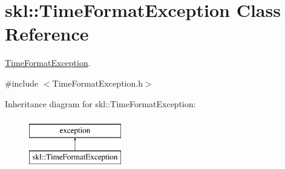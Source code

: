 \hypertarget{classskl_1_1_time_format_exception}{}\section{skl\+:\+:Time\+Format\+Exception Class Reference}
\label{classskl_1_1_time_format_exception}


\hyperlink{classskl_1_1_time_format_exception}{Time\+Format\+Exception}.  




{\ttfamily \#include $<$Time\+Format\+Exception.\+h$>$}

Inheritance diagram for skl\+:\+:Time\+Format\+Exception\+:\begin{figure}[H]
\begin{center}
\leavevmode
\includegraphics[height=2.000000cm]{classskl_1_1_time_format_exception}
\end{center}
\end{figure}
